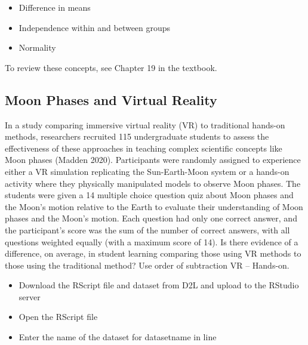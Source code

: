 \documentclass[
]{report}
\begin{document}
\begin{itemize}
\item
  Difference in means
\item
  Independence within and between groups
\item
  Normality
\end{itemize}

To review these concepts, see Chapter 19 in the textbook.

\subsection{Moon Phases and Virtual Reality}\label{moon-phases-and-virtual-reality}

In a study comparing immersive virtual reality (VR) to traditional hands-on methods, researchers recruited 115 undergraduate students to assess the effectiveness of these approaches in teaching complex scientific concepts like Moon phases (Madden 2020). Participants were randomly assigned to experience either a VR simulation replicating the Sun-Earth-Moon system or a hands-on activity where they physically manipulated models to observe Moon phases. The students were given a 14 multiple choice question quiz about Moon phases and the Moon's motion relative to the Earth to evaluate their understanding of Moon phases and the Moon's motion. Each question had only one correct answer, and the participant's score was the sum of the number of correct answers, with all questions weighted equally (with a maximum score of 14). Is there evidence of a difference, on average, in student learning comparing those using VR methods to those using the traditional method? Use order of subtraction VR -- Hands-on.

\begin{itemize}
\item
  Download the RScript file and dataset from D2L and upload to the RStudio server
\item
  Open the RScript file
\item
  Enter the name of the dataset for datasetname in line
\end{itemize}
\end{document}
